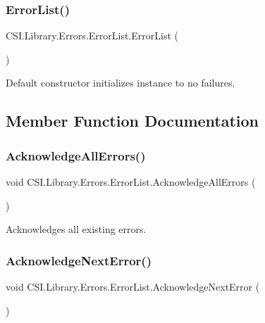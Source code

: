 \subsubsection{\texorpdfstring{ErrorList()}{ErrorList()}}
{\footnotesize\ttfamily C\+S\+I.\+Library.\+Errors.\+Error\+List.\+Error\+List (\begin{DoxyParamCaption}{ }\end{DoxyParamCaption})\hspace{0.3cm}{\ttfamily [inline]}}



Default constructor initializes instance to no failures. 



\subsection{Member Function Documentation}
\mbox{\label{class_c_s_i_1_1_library_1_1_errors_1_1_error_list_a7b50216224a4ba5f76a0d3f2a8456c88}} 
\subsubsection{\texorpdfstring{AcknowledgeAllErrors()}{AcknowledgeAllErrors()}}
{\footnotesize\ttfamily void C\+S\+I.\+Library.\+Errors.\+Error\+List.\+Acknowledge\+All\+Errors (\begin{DoxyParamCaption}{ }\end{DoxyParamCaption})\hspace{0.3cm}{\ttfamily [inline]}}



Acknowledges all existing errors. 

\mbox{\label{class_c_s_i_1_1_library_1_1_errors_1_1_error_list_aa9f18e0016fce313792b0499d4f0e408}} 
\subsubsection{\texorpdfstring{AcknowledgeNextError()}{AcknowledgeNextError()}}
{\footnotesize\ttfamily void C\+S\+I.\+Library.\+Errors.\+Error\+List.\+Acknowledge\+Next\+Error (\begin{DoxyParamCaption}{ }\end{DoxyParamCaption})\hspace{0.3cm}{\ttfamily [inline]}}



